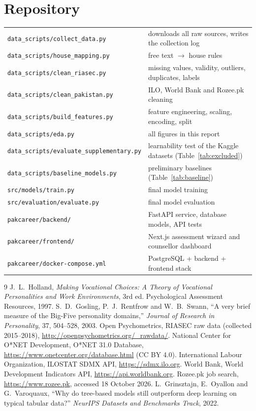 \documentclass[11pt,a4paper]{article}
\begin{document}
\section*{Repository}
\begin{tabular}{@{}ll@{}}
\texttt{data\_scripts/collect\_data.py} & downloads all raw sources, writes the collection log \\
\texttt{data\_scripts/house\_mapping.py} & free text $\rightarrow$ house rules \\
\texttt{data\_scripts/clean\_riasec.py} & missing values, validity, outliers, duplicates, labels \\
\texttt{data\_scripts/clean\_pakistan.py} & ILO, World Bank and Rozee.pk cleaning \\
\texttt{data\_scripts/build\_features.py} & feature engineering, scaling, encoding, split \\
\texttt{data\_scripts/eda.py} & all figures in this report \\
\texttt{data\_scripts/evaluate\_supplementary.py} & learnability test of the Kaggle datasets (Table~\ref{tab:excluded}) \\
\texttt{data\_scripts/baseline\_models.py} & preliminary baselines (Table~\ref{tab:baseline}) \\
\texttt{src/models/train.py} & final model training \\
\texttt{src/evaluation/evaluate.py} & final model evaluation \\
\texttt{pakcareer/backend/} & FastAPI service, database models, API tests \\
\texttt{pakcareer/frontend/} & Next.js assessment wizard and counsellor dashboard \\
\texttt{pakcareer/docker-compose.yml} & PostgreSQL + backend + frontend stack \\
\end{tabular}

\begin{thebibliography}{9}\small
{} J.~L.~Holland, \emph{Making Vocational Choices: A Theory of Vocational Personalities and Work Environments}, 3rd ed. Psychological Assessment Resources, 1997.
 S.~D.~Gosling, P.~J.~Rentfrow and W.~B.~Swann, ``A very brief measure of the Big-Five personality domains,'' \emph{Journal of Research in Personality}, 37, 504--528, 2003.
 Open Psychometrics, RIASEC raw data (collected 2015--2018), \url{http://openpsychometrics.org/_rawdata/}.
 National Center for O*NET Development, O*NET 31.0 Database, \url{https://www.onetcenter.org/database.html} (CC BY 4.0).
 International Labour Organization, ILOSTAT SDMX API, \url{https://sdmx.ilo.org}.
 World Bank, World Development Indicators API, \url{https://api.worldbank.org}.
 Rozee.pk job search, \url{https://www.rozee.pk}, accessed 18 October 2026.
 L.~Grinsztajn, E.~Oyallon and G.~Varoquaux, ``Why do tree-based models still outperform deep learning on typical tabular data?'' \emph{NeurIPS Datasets and Benchmarks Track}, 2022.
\end{thebibliography}
\end{document}
